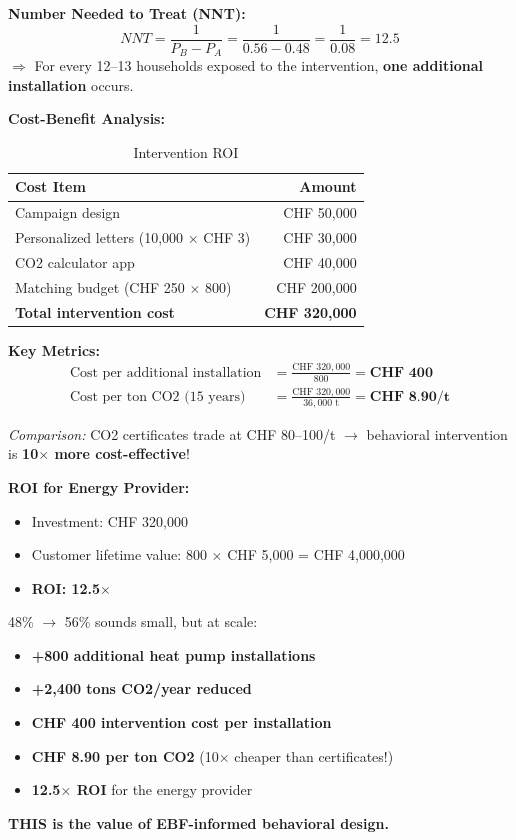 \textbf{Number Needed to Treat (NNT):}
\begin{equation}
NNT = \frac{1}{P_B - P_A} = \frac{1}{0.56 - 0.48} = \frac{1}{0.08} = 12.5
\end{equation}
$\Rightarrow$ For every 12--13 households exposed to the intervention, \textbf{one additional installation} occurs.

\textbf{Cost-Benefit Analysis:}
\begin{table}[htbp]
\centering
\caption{Intervention ROI}
\begin{tabular}{@{}lr@{}}
\toprule
\textbf{Cost Item} & \textbf{Amount} \\
\midrule
Campaign design & CHF 50,000 \\
Personalized letters (10,000 $\times$ CHF 3) & CHF 30,000 \\
CO2 calculator app & CHF 40,000 \\
Matching budget (CHF 250 $\times$ 800) & CHF 200,000 \\
\midrule
\textbf{Total intervention cost} & \textbf{CHF 320,000} \\
\bottomrule
\end{tabular}
\end{table}

\textbf{Key Metrics:}
\begin{align}
\text{Cost per additional installation} &= \frac{\text{CHF } 320,000}{800} = \textbf{CHF 400} \\[1em]
\text{Cost per ton CO2 (15 years)} &= \frac{\text{CHF } 320,000}{36,000 \text{ t}} = \textbf{CHF 8.90/t}
\end{align}

\textit{Comparison:} CO2 certificates trade at CHF 80--100/t $\rightarrow$ behavioral intervention is \textbf{10$\times$ more cost-effective}!

\textbf{ROI for Energy Provider:}
\begin{itemize}
\item Investment: CHF 320,000
\item Customer lifetime value: 800 $\times$ CHF 5,000 = CHF 4,000,000
\item \textbf{ROI: 12.5$\times$}
\end{itemize}

\begin{tcolorbox}[colback=green!5!white,colframe=green!75!black,title=Summary: The Value of Behavioral Design]
48\% $\rightarrow$ 56\% sounds small, but at scale:
\begin{itemize}
\item \textbf{+800 additional heat pump installations}
\item \textbf{+2,400 tons CO2/year reduced}
\item \textbf{CHF 400 intervention cost per installation}
\item \textbf{CHF 8.90 per ton CO2} (10$\times$ cheaper than certificates!)
\item \textbf{12.5$\times$ ROI} for the energy provider
\end{itemize}
\textbf{THIS is the value of EBF-informed behavioral design.}
\end{tcolorbox}




